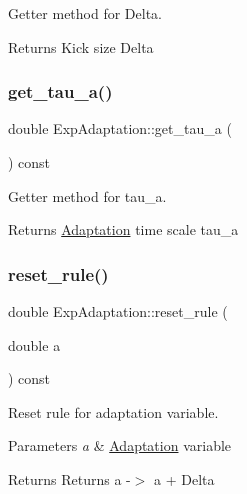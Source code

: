 Getter method for Delta. 

\begin{DoxyReturn}{Returns}
Kick size Delta 
\end{DoxyReturn}
\mbox{\label{classExpAdaptation_a2fab2ad7a21e78b6984116132aed2836}} 
\subsubsection{\texorpdfstring{get\+\_\+tau\+\_\+a()}{get\_tau\_a()}}
{\footnotesize\ttfamily double Exp\+Adaptation\+::get\+\_\+tau\+\_\+a (\begin{DoxyParamCaption}{ }\end{DoxyParamCaption}) const\hspace{0.3cm}{\ttfamily [inline]}}



Getter method for tau\+\_\+a. 

\begin{DoxyReturn}{Returns}
\hyperlink{classAdaptation}{Adaptation} time scale tau\+\_\+a 
\end{DoxyReturn}
\mbox{\label{classExpAdaptation_ac194bba0fd15aea6a68b8964a21fff2d}} 
\subsubsection{\texorpdfstring{reset\+\_\+rule()}{reset\_rule()}}
{\footnotesize\ttfamily double Exp\+Adaptation\+::reset\+\_\+rule (\begin{DoxyParamCaption}\item[{double}]{a }\end{DoxyParamCaption}) const\hspace{0.3cm}{\ttfamily [virtual]}}



Reset rule for adaptation variable. 


\begin{DoxyParams}{Parameters}
{\em a} & \hyperlink{classAdaptation}{Adaptation} variable \\
\hline
\end{DoxyParams}
\begin{DoxyReturn}{Returns}
Returns a -\/$>$ a + Delta 
\end{DoxyReturn}



